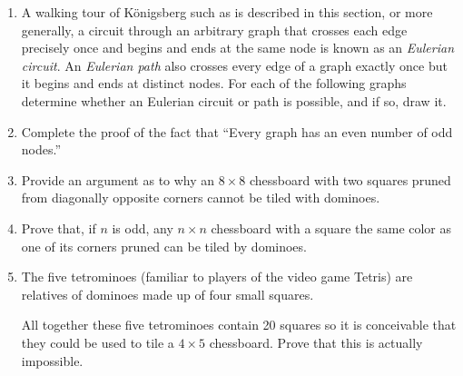 
\begin{enumerate}

\item A walking tour of K\"{o}nigsberg such as is described in this section,
or more generally, a circuit through an arbitrary graph that crosses each
edge precisely once and begins and ends at the same node is known as
an  \emph{Eulerian circuit}.  An  \emph{Eulerian path} also crosses every edge of a graph exactly
once but it begins and ends at distinct nodes.  For each of the following
graphs determine whether an Eulerian circuit or path is possible, and if so,
draw it.

\begin{center}

\end{center}

\begin{center}

\end{center}

\item Complete the proof of the fact that ``Every graph has an even number
of odd nodes.''

\wbvfill

\item Provide an argument as to why an $8 \times 8$ chessboard with 
two squares pruned from diagonally opposite corners cannot be tiled
with dominoes.

\wbvfill

\workbookpagebreak

\item Prove that, if $n$ is odd, any $n \times n$ chessboard with 
a square the same color as one of its corners pruned can be tiled by
dominoes.

\wbvfill

\item The five  tetrominoes (familiar to players of the video game
Tetris) are relatives of dominoes made up of four small squares.

\begin{center}

\end{center}

\noindent All together these five tetrominoes contain 20 squares
so it is conceivable that they could be used to tile a $4 \times 5$
chessboard.  Prove that this is actually impossible.

\wbvfill


\end{enumerate}
